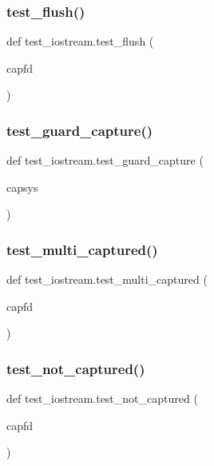 \subsubsection{\texorpdfstring{test\_flush()}{test\_flush()}}
{\footnotesize\ttfamily def test\+\_\+iostream.\+test\+\_\+flush (\begin{DoxyParamCaption}\item[{}]{capfd }\end{DoxyParamCaption})}

\mbox{\label{namespacetest__iostream_af6c25a47a519cbbef51606064eab4ade}} 
\subsubsection{\texorpdfstring{test\_guard\_capture()}{test\_guard\_capture()}}
{\footnotesize\ttfamily def test\+\_\+iostream.\+test\+\_\+guard\+\_\+capture (\begin{DoxyParamCaption}\item[{}]{capsys }\end{DoxyParamCaption})}

\mbox{\label{namespacetest__iostream_a4a86eb8c1924e9050a19bc15b2abcaa1}} 
\subsubsection{\texorpdfstring{test\_multi\_captured()}{test\_multi\_captured()}}
{\footnotesize\ttfamily def test\+\_\+iostream.\+test\+\_\+multi\+\_\+captured (\begin{DoxyParamCaption}\item[{}]{capfd }\end{DoxyParamCaption})}

\mbox{\label{namespacetest__iostream_a965c54c2196c3bc2051bb644421b61a0}} 
\subsubsection{\texorpdfstring{test\_not\_captured()}{test\_not\_captured()}}
{\footnotesize\ttfamily def test\+\_\+iostream.\+test\+\_\+not\+\_\+captured (\begin{DoxyParamCaption}\item[{}]{capfd }\end{DoxyParamCaption})}

